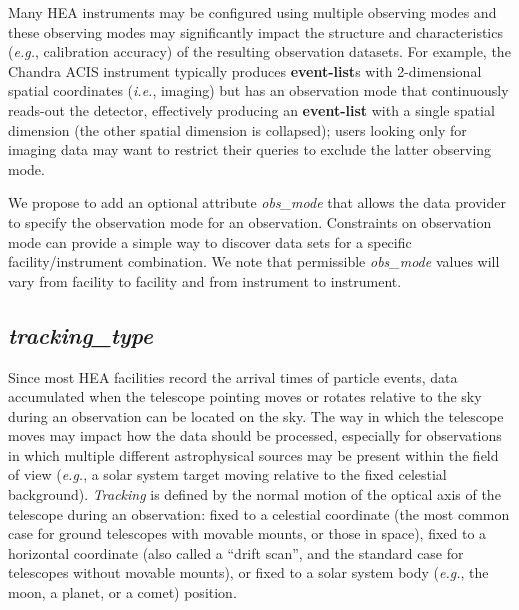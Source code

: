 \documentclass[11pt,a4paper]{ivoa}
\begin{document}
Many \gls{HEA} instruments may be configured using multiple observing modes and these observing modes may significantly impact the structure and characteristics ({\em e.g.\/}, calibration accuracy) of the resulting observation datasets. For example, the Chandra ACIS instrument typically produces {\bf event-list}s with 2-dimensional spatial coordinates ({\em i.e.\/}, imaging) but has an observation mode that continuously reads-out the detector, effectively producing an {\bf event-list} with a single spatial dimension (the other spatial dimension is collapsed); users looking only for imaging data may want to restrict their queries to exclude the latter observing mode.

We propose to add an optional attribute {\em obs\_mode\/} that allows the data provider to specify the observation mode for an observation.  Constraints on observation mode can provide a simple way to discover data sets for a specific facility/instrument combination.  We note that permissible {\em obs\_mode\/} values will vary from facility to facility and from instrument to instrument.


\subsection{{\em tracking\_type}}

Since most \gls{HEA} facilities record the arrival times of particle events, data accumulated when the telescope pointing moves or rotates relative to the sky during an observation can be located on the sky.  The way in which the telescope moves may impact how the data should be processed, especially for observations in which multiple different astrophysical sources may be present within the field of view ({\em e.g.\/}, a solar system target moving relative to the fixed celestial background).  {\em Tracking\/} is defined by the normal motion of the optical axis of the telescope during an observation: fixed to a celestial coordinate (the most common case for ground telescopes with movable mounts, or those in space),  fixed to a horizontal coordinate (also called a ``drift scan'', and the standard case for telescopes without movable mounts),  or fixed to a solar system body ({\em e.g.\/}, the moon, a planet, or a comet) position.
\end{document}
